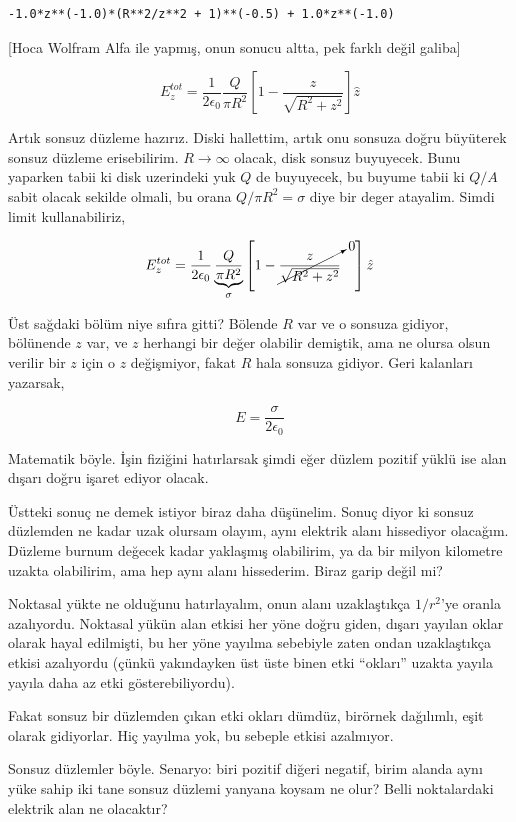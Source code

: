 \documentclass[12pt,fleqn]{article}\usepackage{../../common}
\begin{document}
\begin{verbatim}
-1.0*z**(-1.0)*(R**2/z**2 + 1)**(-0.5) + 1.0*z**(-1.0)
\end{verbatim}

[Hoca Wolfram Alfa ile yapmış, onun sonucu altta, pek farklı değil galiba]

$$
E_z^{tot} = \frac{1}{2\epsilon_0} \frac{Q}{\pi R^2}
\left[  1 - \frac{z}{\sqrt{R^2 + z^2}}  \right] \hat{z}
$$

Artık sonsuz düzleme hazırız. Diski hallettim, artık onu sonsuza doğru büyüterek
sonsuz düzleme erisebilirim. $R \to \infty$ olacak, disk sonsuz buyuyecek. Bunu
yaparken tabii ki disk uzerindeki yuk $Q$ de buyuyecek, bu buyume tabii ki $Q/A$
sabit olacak sekilde olmali, bu orana $Q / \pi R^2 = \sigma$ diye bir deger
atayalim. Simdi limit kullanabiliriz, 

$$
E_z^{tot} = \frac{1}{2\epsilon_0} \underbrace{\frac{Q}{\pi R^2}}_{\sigma}
\left[  1 - \cancelto{0}{\frac{z}{\sqrt{R^2 + z^2}}} \quad \right] \hat{z}
$$

Üst sağdaki bölüm niye sıfıra gitti? Bölende $R$ var ve o sonsuza gidiyor,
bölünende $z$ var, ve $z$ herhangi bir değer olabilir demiştik, ama ne olursa
olsun verilir bir $z$ için o $z$ değişmiyor, fakat $R$ hala sonsuza
gidiyor. Geri kalanları yazarsak,

$$
E = \frac{\sigma}{2\epsilon_0}
$$

Matematik böyle. İşin fiziğini hatırlarsak şimdi eğer düzlem pozitif yüklü ise
alan dışarı doğru işaret ediyor olacak. 

Üstteki sonuç ne demek istiyor biraz daha düşünelim. Sonuç diyor ki sonsuz
düzlemden ne kadar uzak olursam olayım, aynı elektrik alanı hissediyor
olacağım. Düzleme burnum değecek kadar yaklaşmış olabilirim, ya da bir milyon
kilometre uzakta olabilirim, ama hep aynı alanı hissederim. Biraz garip değil
mi?

Noktasal yükte ne olduğunu hatırlayalım, onun alanı uzaklaştıkça $1/r^2$'ye
oranla azalıyordu. Noktasal yükün alan etkisi her yöne doğru giden, dışarı
yayılan oklar olarak hayal edilmişti, bu her yöne yayılma sebebiyle zaten ondan
uzaklaştıkça etkisi azalıyordu (çünkü yakındayken üst üste binen etki
``okları'' uzakta yayıla yayıla daha az etki gösterebiliyordu).

Fakat sonsuz bir düzlemden çıkan etki okları dümdüz, birörnek dağılımlı, eşit
olarak gidiyorlar. Hiç yayılma yok, bu sebeple etkisi azalmıyor. 

Sonsuz düzlemler böyle. Senaryo: biri pozitif diğeri negatif, birim alanda aynı
yüke sahip iki tane sonsuz düzlemi yanyana koysam ne olur? Belli noktalardaki
elektrik alan ne olacaktır?
\end{document}
